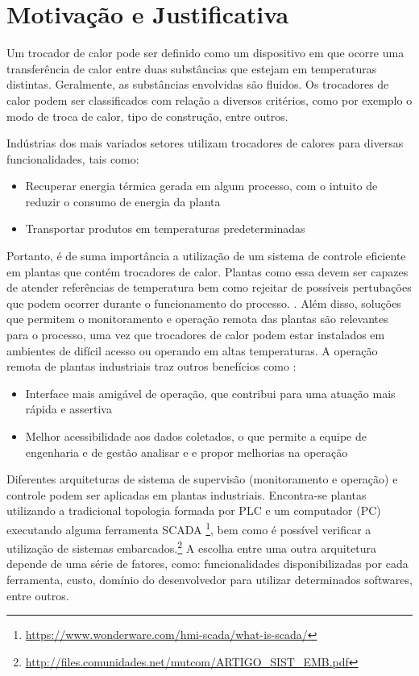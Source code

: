 \section{Motivação e Justificativa}

	Um trocador de calor pode ser definido como um dispositivo em que ocorre uma transferência de calor entre duas substâncias que estejam em temperaturas distintas. Geralmente, as substâncias envolvidas são fluidos. Os trocadores de calor podem ser classificados com relação a diversos critérios, como por exemplo o modo de troca de calor, tipo de construção, entre outros. \cite{kreith2011}
	
	Indústrias dos mais variados setores utilizam trocadores de calores para diversas funcionalidades, tais como:
	
	\begin{itemize}
		\item 
		Recuperar energia térmica gerada em algum processo, com o intuito de reduzir o consumo de energia da planta
		\item 
		Transportar produtos em temperaturas predeterminadas
	\end{itemize}

	Portanto, é de suma importância a utilização de um sistema de controle eficiente em plantas que contém trocadores de calor. Plantas como essa devem ser capazes de atender referências de temperatura bem como rejeitar de possíveis pertubações que podem ocorrer durante o funcionamento do processo. \cite{novazzi2007}. Além disso, soluções que permitem o monitoramento e operação remota das plantas são relevantes para o processo, uma vez que trocadores de calor podem estar instalados em ambientes de difícil acesso ou operando em altas temperaturas. A operação remota de plantas industriais traz outros benefícios como \cite{babau2009}:
	\begin{itemize}
		\item 
		Interface mais amigável de operação, que contribui para uma atuação mais rápida e assertiva
		\item 
		Melhor acessibilidade aos dados coletados, o que permite a equipe de engenharia e de gestão analisar e e propor melhorias na operação
	\end{itemize}

	Diferentes arquiteturas de sistema de supervisão (monitoramento e operação) e controle podem ser aplicadas em plantas industriais. Encontra-se plantas utilizando a tradicional topologia formada por PLC e um computador (PC) executando alguma ferramenta SCADA \footnote{\url{https://www.wonderware.com/hmi-scada/what-is-scada/}}, bem como é possível verificar a utilização de sistemas embarcados.\footnote{\url{http://files.comunidades.net/mutcom/ARTIGO_SIST_EMB.pdf}} A escolha entre uma outra arquitetura depende de uma série de fatores, como: funcionalidades disponibilizadas por cada ferramenta, custo, domínio do desenvolvedor para utilizar determinados softwares, entre outros.
	
